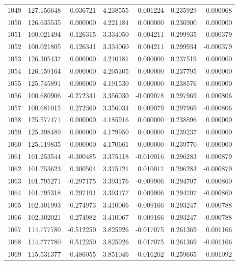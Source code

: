 \begin{tabular}{rrrrrrr}
1049 & 127.156648 &    0.036721 &  4.238555 &    0.001224 &    0.235929 & -0.000068 \\
1050 & 126.635535 &    0.000000 &  4.221184 &    0.000000 &    0.236900 &  0.000000 \\
1051 & 100.021494 &   -0.126315 &  3.334050 &   -0.004211 &    0.299935 &  0.000379 \\
1052 & 100.021805 &    0.126341 &  3.334060 &    0.004211 &    0.299934 & -0.000379 \\
1053 & 126.305437 &    0.000000 &  4.210181 &    0.000000 &    0.237519 &  0.000000 \\
1054 & 126.159164 &    0.000000 &  4.205305 &    0.000000 &    0.237795 &  0.000000 \\
1055 & 125.745891 &    0.000000 &  4.191530 &    0.000000 &    0.238576 &  0.000000 \\
1056 & 100.680906 &   -0.272341 &  3.356030 &   -0.009078 &    0.297969 &  0.000806 \\
1057 & 100.681015 &    0.272360 &  3.356034 &    0.009079 &    0.297969 & -0.000806 \\
1058 & 125.577471 &    0.000000 &  4.185916 &    0.000000 &    0.238896 &  0.000000 \\
1059 & 125.398489 &    0.000000 &  4.179950 &    0.000000 &    0.239237 &  0.000000 \\
1060 & 125.119835 &    0.000000 &  4.170661 &    0.000000 &    0.239770 &  0.000000 \\
1061 & 101.253544 &   -0.300485 &  3.375118 &   -0.010016 &    0.296283 &  0.000879 \\
1062 & 101.253623 &    0.300504 &  3.375121 &    0.010017 &    0.296283 & -0.000879 \\
1063 & 101.795271 &   -0.297175 &  3.393176 &   -0.009906 &    0.294707 &  0.000860 \\
1064 & 101.795318 &    0.297191 &  3.393177 &    0.009906 &    0.294707 & -0.000860 \\
1065 & 102.301993 &   -0.274973 &  3.410066 &   -0.009166 &    0.293247 &  0.000788 \\
1066 & 102.302021 &    0.274982 &  3.410067 &    0.009166 &    0.293247 & -0.000788 \\
1067 & 114.777780 &   -0.512250 &  3.825926 &   -0.017075 &    0.261369 &  0.001166 \\
1068 & 114.777780 &    0.512250 &  3.825926 &    0.017075 &    0.261369 & -0.001166 \\
1069 & 115.531377 &   -0.486055 &  3.851046 &   -0.016202 &    0.259665 &  0.001092 \\

\end{tabular}
